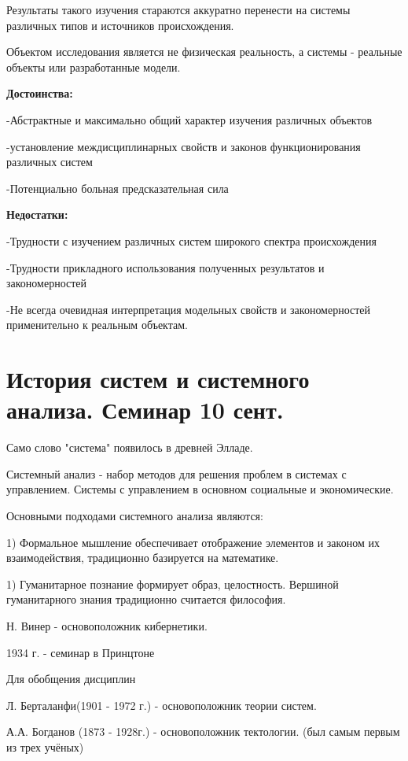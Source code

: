 \documentclass[a4paper]{article}
\begin{document}
	Результаты такого изучения стараются аккуратно перенести на системы различных типов и источников происхождения.
	
	Объектом исследования является не физическая реальность, а системы - реальные объекты или разработанные модели.
	
	\textbf{Достоинства:}
	
	-Абстрактные и максимально общий характер изучения различных объектов
	
	-установление междисциплинарных свойств и законов функционирования различных систем
	
	-Потенциально больная предсказательная сила
	
	\textbf{Недостатки:}
	
	-Трудности с изучением различных систем широкого спектра происхождения
	
	-Трудности прикладного использования полученных результатов и закономерностей
	
	-Не всегда очевидная интерпретация модельных свойств и закономерностей применительно к реальным объектам.
	

	
	\section{История систем и  системного анализа. Семинар 10 сент.}
	
	Само слово "система" появилось в древней Элладе.
	
	Системный анализ - набор методов для решения проблем в системах с управлением. Системы с управлением в основном социальные и экономические.
	
	Основными подходами системного анализа являются:
	
	1) Формальное мышление обеспечивает отображение элементов и законом их взаимодействия, традиционно базируется на математике.
	
	1) Гуманитарное познание формирует образ, целостность. Вершиной гуманитарного знания традиционно считается философия. 
	
	Н. Винер - основоположник кибернетики.
	
	1934 г. - семинар в Принцтоне
	
	Для обобщения дисциплин
	
	Л. Берталанфи(1901 - 1972 г.) - основоположник теории систем.
	
	А.А. Богданов (1873 - 1928г.) - основоположник тектологии. (был самым первым из трех учёных)
	
\end{document}
